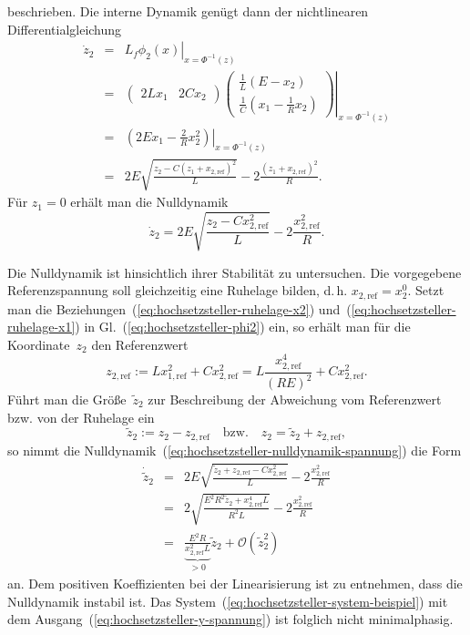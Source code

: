 beschrieben. Die interne Dynamik genügt dann der nichtlinearen Differentialgleichung
\[
\begin{array}{ccl}
\dot{z}_{2} & = & \left.L_{f}\phi_{2}(x)\right|_{x=\Phi^{-1}(z)}\\
 & = & \left.\left(\begin{array}{cc}
2Lx_{1} & 2Cx_{2}\end{array}\right)\left(\begin{array}{c}
\frac{1}{L}(E-x_{2})\\
\frac{1}{C}(x_{1}-\frac{1}{R}x_{2})
\end{array}\right)\right|_{x=\Phi^{-1}(z)}\\
 & = & \left.\left(2Ex_{1}-\frac{2}{R}x_{2}^{2}\right)\right|_{x=\Phi^{-1}(z)}\\
 & = & 2E\sqrt{\frac{z_{2}-C(z_{1}+x_{2,\text{ref}})^{2}}{L}}-2\frac{(z_{1}+x_{2,\text{ref}})^{2}}{R}.
\end{array}
\]
Für $z_{1}=0$ erhält man die Nulldynamik 
\begin{equation}
\dot{z}_{2}=2E\sqrt{\frac{z_{2}-Cx_{2,\text{ref}}^{2}}{L}}-2\frac{x_{2,\text{ref}}^{2}}{R}.\label{eq:hochsetzsteller-nulldynamik-spannung}
\end{equation}

Die Nulldynamik ist hinsichtlich ihrer Stabilität zu untersuchen.
Die vorgegebene Referenzspannung soll gleichzeitig eine Ruhelage bilden,
d.\,h. $x_{2,\text{ref}}=x_{2}^{0}$. Setzt man die Beziehungen~(\ref{eq:hochsetzsteller-ruhelage-x2})
und~(\ref{eq:hochsetzsteller-ruhelage-x1}) in Gl.~(\ref{eq:hochsetzsteller-phi2})
ein, so erhält man für die Koordinate~$z_{2}$ den Referenzwert 
\[
z_{2,\text{ref}}:=Lx_{1,\text{ref}}^{2}+Cx_{2,\text{ref}}^{2}=L\frac{x_{2,\text{ref}}^{4}}{(RE)^{2}}+Cx_{2,\text{ref}}^{2}.
\]
Führt man die Größe~$\tilde{z}_{2}$ zur Beschreibung der Abweichung
vom Referenzwert bzw. von der Ruhelage ein 
\[
\tilde{z}_{2}:=z_{2}-z_{2,\text{ref}}\quad\text{bzw.}\quad z_{2}=\tilde{z}_{2}+z_{2,\text{ref}},
\]
so nimmt die Nulldynamik~(\ref{eq:hochsetzsteller-nulldynamik-spannung})
die Form 
\begin{eqnarray*}
\dot{\tilde{z}}_{2} & = & 2E\sqrt{\frac{\tilde{z}_{2}+z_{2,\text{ref}}-Cx_{2,\text{ref}}^{2}}{L}}-2\frac{x_{2,\text{ref}}^{2}}{R}\\
 & = & 2\sqrt{\frac{E^{2}R^{2}\tilde{z}_{2}+x_{2,\text{ref}}^{4}L}{R^{2}L}}-2\frac{x_{2,\text{ref}}^{2}}{R}\\
 & = & \underbrace{\frac{E^{2}R}{x_{2,\text{ref}}^{2}L}}_{{\displaystyle >0}}\tilde{z}_{2}+\mathcal{O}(\tilde{z}_{2}^{2})
\end{eqnarray*}
an. Dem positiven Koeffizienten bei der Linearisierung ist zu entnehmen,
dass die Nulldynamik instabil ist. Das System~(\ref{eq:hochsetzsteller-system-beispiel})
mit dem Ausgang~(\ref{eq:hochsetzsteller-y-spannung}) ist folglich
nicht minimalphasig.

